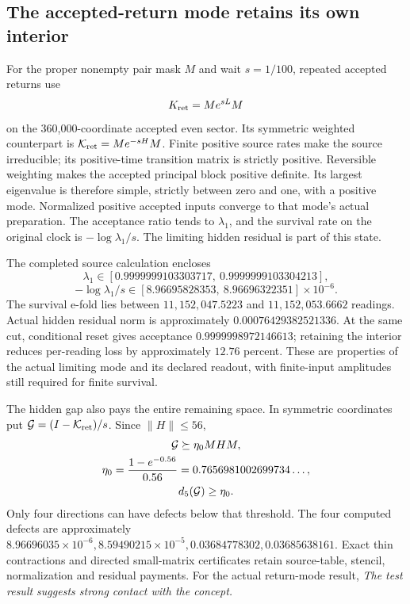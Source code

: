 \subsection{The accepted-return mode retains its own interior}

For the proper nonempty pair mask \(M\) and wait \(s=1/100\), repeated
accepted returns use
\[
 K_{\rm ret}=Me^{sL}M
\]
on the 360,000-coordinate accepted even sector. Its symmetric weighted
counterpart is \(\mathcal K_{\rm ret}=Me^{-sH}M\). Finite positive source
rates make the source irreducible; its positive-time transition matrix
is strictly positive. Reversible weighting makes the accepted principal
block positive definite. Its largest eigenvalue is therefore simple,
strictly between zero and one, with a positive mode. Normalized positive
accepted inputs converge to that mode's actual preparation. The
acceptance ratio tends to \(\lambda_1\), and the survival rate on the
original clock is \(-\log\lambda_1/s\). The limiting hidden residual is
part of this state.

The completed source calculation encloses
\[
 \lambda_1\in
 [0.9999999103303717,\ 0.9999999103304213],
\]
\[
 -\log\lambda_1/s\in
 [8.96695828353,\ 8.96696322351]\times10^{-6}.
\]
The survival e-fold lies between \(11{,}152{,}047.5223\) and
\(11{,}152{,}053.6662\) readings. Actual hidden residual norm is
approximately \(0.00076429382521336\). At the same cut, conditional
reset gives acceptance \(0.9999998972146613\); retaining the interior
reduces per-reading loss by approximately \(12.76\) percent.
These are properties of the actual limiting mode and its declared
readout, with finite-input amplitudes still required for finite survival.

The hidden gap also pays the entire remaining space. In symmetric
coordinates put \({\cal G}=(I-\mathcal K_{\rm ret})/s\). Since \(\|H\|\leq56\),
\[
\begin{gathered}
{\cal G}\succeq \eta_0MHM,\\
\eta_0=\frac{1-e^{-0.56}}{0.56}=0.7656981002699734\ldots,
 \\
d_5({\cal G})\geq \eta_0.
\end{gathered}
\]
Only four directions can have defects below that threshold. The four
computed defects are approximately
\(8.96696035\times10^{-6},8.59490215\times10^{-5},
0.03684778302,0.03685638161\). Exact thin contractions and directed
small-matrix certificates retain source-table, stencil, normalization
and residual payments. For the actual return-mode result,
\emph{The test result suggests strong contact with the concept.}

